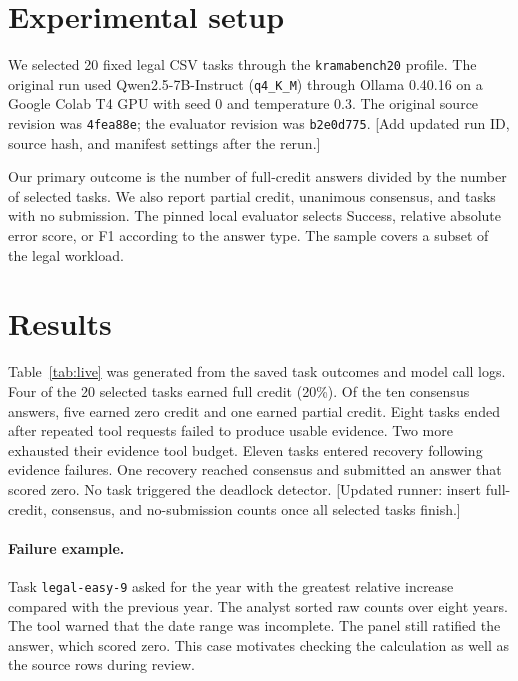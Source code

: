 \documentclass[11pt,a4paper,twocolumn]{article}
\begin{document}
\section{Experimental setup}
We selected 20 fixed legal CSV tasks through the \texttt{kramabench20} profile. The original run used Qwen2.5-7B-Instruct (\texttt{q4\_K\_M}) through Ollama 0.40.16 on a Google Colab T4 GPU with seed 0 and temperature 0.3. The original source revision was \texttt{4fea88e}; the evaluator revision was \texttt{b2e0d775}. [Add updated run ID, source hash, and manifest settings after the rerun.]

Our primary outcome is the number of full-credit answers divided by the number of selected tasks. We also report partial credit, unanimous consensus, and tasks with no submission. The pinned local evaluator selects Success, relative absolute error score, or F1 according to the answer type. The sample covers a subset of the legal workload.

\section{Results}
\begin{table}[ht]
\centering\small

\caption{Original 20-task run. Each task contributes its latest outcome to the upper panel. The lower panel counts model calls and tokens across all attempts.}
\label{tab:live}
\end{table}

Table~\ref{tab:live} was generated from the saved task outcomes and model call logs. Four of the 20 selected tasks earned full credit (20\%). Of the ten consensus answers, five earned zero credit and one earned partial credit. Eight tasks ended after repeated tool requests failed to produce usable evidence. Two more exhausted their evidence tool budget. Eleven tasks entered recovery following evidence failures. One recovery reached consensus and submitted an answer that scored zero. No task triggered the deadlock detector. [Updated runner: insert full-credit, consensus, and no-submission counts once all selected tasks finish.]

\paragraph{Failure example.} Task \texttt{legal-easy-9} asked for the year with the greatest relative increase compared with the previous year. The analyst sorted raw counts over eight years. The tool warned that the date range was incomplete. The panel still ratified the answer, which scored zero. This case motivates checking the calculation as well as the source rows during review.
\end{document}
